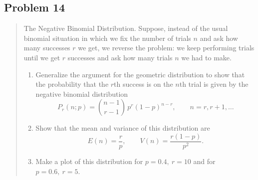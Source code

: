 \subsection*{Problem 14}
\begin{quote}
The Negative Binomial Distribution. Suppose, instead of the usual binomial situation in which we fix the number of trials $n$ and ask how many successes $r$ we get, we reverse the problem: we keep performing trials until we get $r$ successes and ask how many trials $n$ we had to make.
\begin{enumerate}[label=(\alph*)]
	\item Generalize the argument for the geometric distribution to show that the probability that the $r$th success is on the $n$th trial is given by the negative binomial distribution
	\[
		P_r(n;p) = {n-1 \choose r-1}\, p^r (1-p)^{n-r}, \qquad n=r, r+1,\ldots
	\]
	\item Show that the mean and variance of this distribution are
	\[
		E(n)=\frac{r}{p}, \qquad V(n)=\frac{r(1-p)}{p^2}.
	\]
	\item Make a plot of this distribution for $p=0.4,\ r=10$ and for $p=0.6,\ r=5$.
\end{enumerate}
\end{quote}
